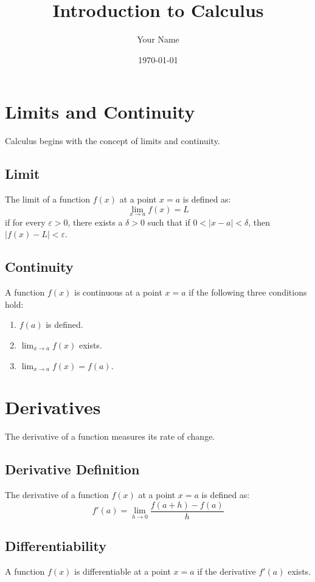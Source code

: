 \documentclass{article}
\title{Introduction to Calculus}
\author{Your Name}
\date{\today}
\begin{document}
\maketitle

\section{Limits and Continuity}
Calculus begins with the concept of limits and continuity.

\subsection{Limit}
The limit of a function \(f(x)\) at a point \(x = a\) is defined as:
\[
\lim_{{x \to a}} f(x) = L
\]
if for every \(\varepsilon > 0\), there exists a \(\delta > 0\) such that if \(0 < |x - a| < \delta\), then \(|f(x) - L| < \varepsilon\).

\subsection{Continuity}
A function \(f(x)\) is continuous at a point \(x = a\) if the following three conditions hold:
\begin{enumerate}
    \item \(f(a)\) is defined.
    \item \(\lim_{{x \to a}} f(x)\) exists.
    \item \(\lim_{{x \to a}} f(x) = f(a)\).
\end{enumerate}

\section{Derivatives}
The derivative of a function measures its rate of change.

\subsection{Derivative Definition}
The derivative of a function \(f(x)\) at a point \(x = a\) is defined as:
\[
f'(a) = \lim_{{h \to 0}} \frac{f(a + h) - f(a)}{h}
\]

\subsection{Differentiability}
A function \(f(x)\) is differentiable at a point \(x = a\) if the derivative \(f'(a)\) exists.
\end{document}
